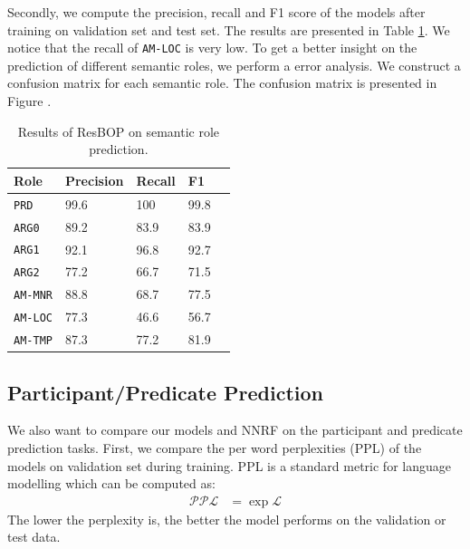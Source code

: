 \documentclass[a4paper]{article}
\begin{document}
Secondly, we compute the precision, recall and F1 score of the models after training on validation set and test set. The results are presented in Table \ref{tab:eval-role}. We notice that the recall of \texttt{AM-LOC} is very low. 
To get a better insight on the prediction of different semantic roles, we perform a error analysis. We construct a confusion matrix for each semantic role. The confusion matrix is presented in Figure .

\begin{table}[t]
\centering
\begin{tabular}{l||llll}
\textbf{Role}   &   Precision   &   Recall &   F1   \\ \hline
\texttt{PRD}    &   99.6 &   100       &   99.8 \\
\texttt{ARG0}   &   89.2 &   83.9      &   83.9 \\
\texttt{ARG1}   &   92.1 &   96.8      &   92.7 \\
\texttt{ARG2}   &   77.2 &   66.7      &   71.5 \\
\texttt{AM-MNR} &   88.8 &   68.7      &   77.5 \\
\texttt{AM-LOC} &   77.3 &   46.6      &   56.7 \\
\texttt{AM-TMP} &   87.3 &   77.2      &   81.9 \\
\end{tabular}
\caption{\label{tab:eval-role} Results of ResBOP on semantic role prediction.}
\end{table}


\subsection{Participant/Predicate Prediction}  \label{sec:wordprediction}
We also want to compare our models and NNRF on the participant and predicate prediction tasks. First, we compare the per word perplexities (PPL) of the models on validation set during training. PPL is a standard metric for language modelling which can be computed as: 
\begin{equation} \label{eq:perplexity}
\begin{aligned}
    \mathcal{PPL}
        &= \exp \mathcal{L}
\end{aligned}
\end{equation}
The lower the perplexity is, the better the model performs on the validation or test data. 
\end{document}
